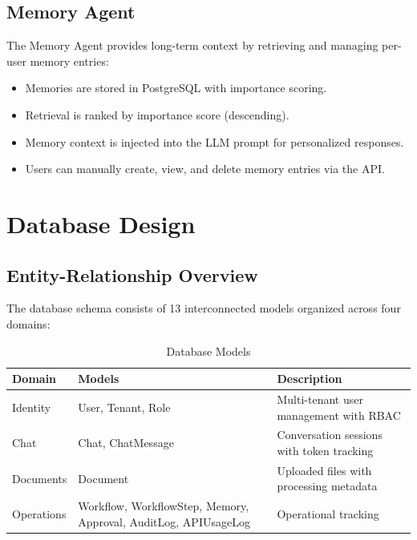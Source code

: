 \documentclass[12pt, a4paper]{report}
\begin{document}
\section{Memory Agent}

The Memory Agent provides long-term context by retrieving and managing per-user memory entries:

\begin{itemize}
    \item Memories are stored in PostgreSQL with importance scoring.
    \item Retrieval is ranked by importance score (descending).
    \item Memory context is injected into the LLM prompt for personalized responses.
    \item Users can manually create, view, and delete memory entries via the API.
\end{itemize}

\chapter{Database Design}

\section{Entity-Relationship Overview}

The database schema consists of 13 interconnected models organized across four domains:

\begin{table}[H]
\centering
\caption{Database Models}
\label{tab:models}
\small
\begin{tabular}{p{2cm}|p{6.5cm}|p{5.5cm}}
\toprule
\textbf{Domain} & \textbf{Models} & \textbf{Description} \\
\midrule
Identity  & User, Tenant, Role       & Multi-tenant user management with RBAC \\
Chat      & Chat, ChatMessage        & Conversation sessions with token tracking \\
Documents & Document                 & Uploaded files with processing metadata \\
Operations & Workflow, WorkflowStep, Memory, Approval, AuditLog, APIUsageLog & Operational tracking \\
\bottomrule
\end{tabular}
\end{table}
\normalsize
\end{document}
